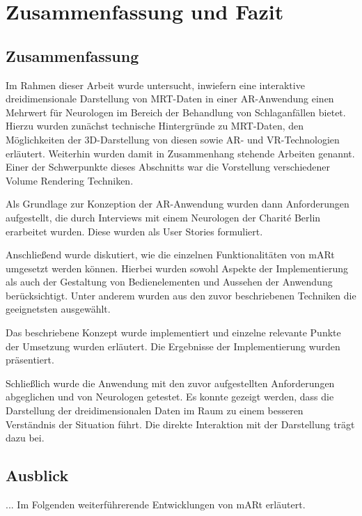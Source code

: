 
\chapter{Zusammenfassung und Fazit}
\label{fazit}

\section{Zusammenfassung}

Im Rahmen dieser Arbeit wurde untersucht, inwiefern eine interaktive dreidimensionale Darstellung von MRT-Daten in einer AR-Anwendung einen Mehrwert für Neurologen im Bereich der Behandlung von Schlaganfällen bietet. 
Hierzu wurden zunächst technische Hintergründe zu MRT-Daten, den Möglichkeiten der 3D-Darstellung von diesen sowie AR- und VR-Technologien erläutert. Weiterhin wurden damit in Zusammenhang stehende Arbeiten genannt. Einer der Schwerpunkte dieses Abschnitts war die Vorstellung verschiedener Volume Rendering Techniken.

Als Grundlage zur Konzeption der AR-Anwendung wurden dann Anforderungen aufgestellt, die durch Interviews mit einem Neurologen der Charité Berlin erarbeitet wurden. Diese wurden als User Stories formuliert.

Anschließend wurde diskutiert, wie die einzelnen Funktionalitäten von mARt umgesetzt werden können. Hierbei wurden sowohl Aspekte der Implementierung als auch der Gestaltung von Bedienelementen und Aussehen der Anwendung berücksichtigt. Unter anderem wurden aus den zuvor beschriebenen Techniken die geeignetsten ausgewählt. 

Das beschriebene Konzept wurde implementiert und einzelne relevante Punkte der Umsetzung wurden erläutert. Die Ergebnisse der Implementierung wurden präsentiert.

Schließlich wurde die Anwendung mit den zuvor aufgestellten Anforderungen abgeglichen und von Neurologen getestet. 
Es konnte gezeigt werden, dass die Darstellung der dreidimensionalen Daten im Raum zu einem besseren Verständnis der Situation führt. Die direkte Interaktion mit der Darstellung trägt dazu bei. 

\section{Ausblick}

...
Im Folgenden weiterführerende Entwicklungen von mARt erläutert.

